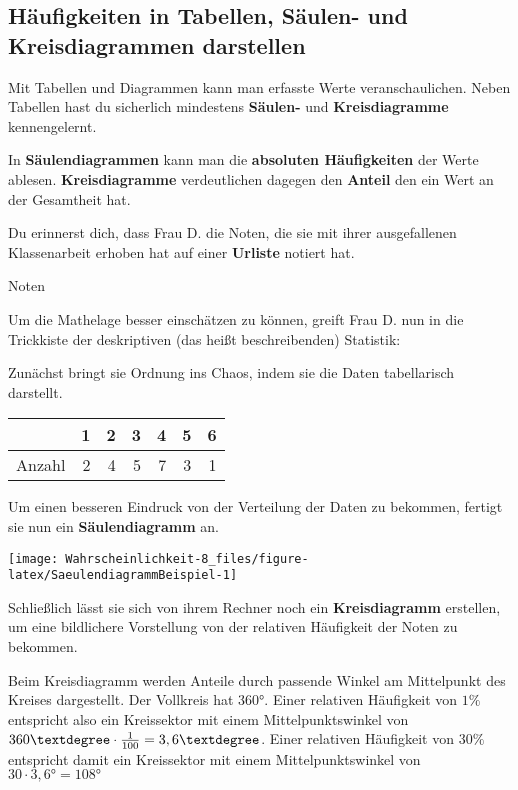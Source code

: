 \documentclass[
  ngerman,
]{book}
\begin{document}
\hypertarget{huxe4ufigkeiten-in-tabellen-suxe4ulen--und-kreisdiagrammen-darstellen}{%
\subsection*{Häufigkeiten in Tabellen, Säulen- und Kreisdiagrammen darstellen}\label{huxe4ufigkeiten-in-tabellen-suxe4ulen--und-kreisdiagrammen-darstellen}}

Mit Tabellen und Diagrammen kann man erfasste Werte veranschaulichen. Neben Tabellen hast du sicherlich mindestens \textbf{Säulen-} und \textbf{Kreisdiagramme} kennengelernt.

In \textbf{Säulendiagrammen} kann man die \textbf{absoluten Häufigkeiten} der Werte ablesen. \textbf{Kreisdiagramme} verdeutlichen dagegen den \textbf{Anteil} den ein Wert an der Gesamtheit hat.

Du erinnerst dich, dass Frau D. die Noten, die sie mit ihrer ausgefallenen Klassenarbeit erhoben hat auf einer \textbf{Urliste} notiert hat.

Noten

Um die Mathelage besser einschätzen zu können, greift Frau D. nun in die Trickkiste der deskriptiven (das heißt beschreibenden) Statistik:

Zunächst bringt sie Ordnung ins Chaos, indem sie die Daten tabellarisch darstellt.

\begin{tabular}[t]{l|r|r|r|r|r|r}
\hline
  & 1 & 2 & 3 & 4 & 5 & 6\\
\hline
Anzahl & 2 & 4 & 5 & 7 & 3 & 1\\
\hline
\end{tabular}

Um einen besseren Eindruck von der Verteilung der Daten zu bekommen, fertigt sie nun ein \textbf{Säulendiagramm} an.

\begin{center}\texttt{[image: Wahrscheinlichkeit-8\_files/figure-latex/SaeulendiagrammBeispiel-1]} \end{center}

Schließlich lässt sie sich von ihrem Rechner noch ein \textbf{Kreisdiagramm} erstellen, um eine bildlichere Vorstellung von der relativen Häufigkeit der Noten zu bekommen.

Beim Kreisdiagramm werden Anteile durch passende Winkel am Mittelpunkt des Kreises dargestellt. Der Vollkreis hat 360°. Einer relativen Häufigkeit von \(1\%\) entspricht also ein Kreissektor mit einem Mittelpunktswinkel von \(360° \cdot {1 \over 100} = 3,6°\). Einer relativen Häufigkeit von \(30\%\) entspricht damit ein Kreissektor mit einem Mittelpunktswinkel von \(30 \cdot 3,6° = 108°\)
\end{document}
